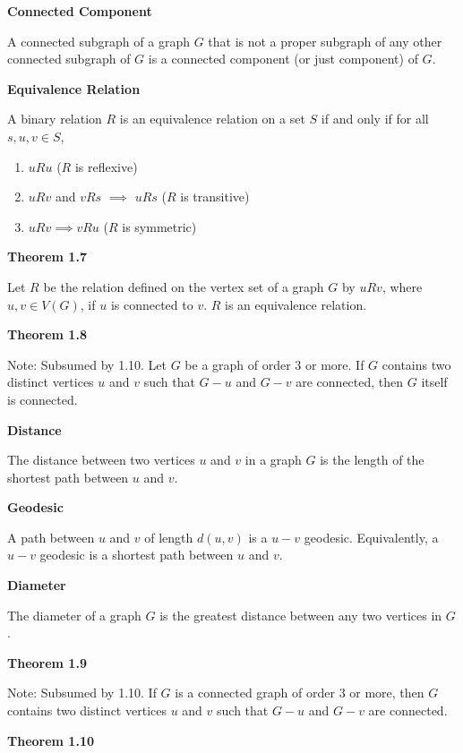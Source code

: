 \documentclass{article}
\begin{document}
\medskip\noindent\textbf{Connected Component}

    A connected subgraph of a graph $G$ that is not a proper subgraph of any other connected subgraph of $G$ is a connected component (or just component) of $G$.

\medskip\noindent\textbf{Equivalence Relation}

    A binary relation $R$ is an equivalence relation on a set $S$ if and only if for all $s,u,v \in S$,
    \begin{enumerate}
        \item $u R u$ ($R$ is reflexive)
        \item $u R v$ and $v R s$ $\implies$ $u R s$ ($R$ is transitive)
        \item $u R v \implies v R u$ ($R$ is symmetric)
    \end{enumerate}

\medskip\noindent\textbf{Theorem 1.7}

    Let $R$ be the relation defined on the vertex set of a graph $G$ by $u R v$, where $u,v \in V(G)$, if $u$ is connected to $v$. $R$ is an equivalence relation.

\medskip\noindent\textbf{Theorem 1.8}

    Note: Subsumed by 1.10.
    Let $G$ be a graph of order 3 or more. If $G$ contains two distinct vertices $u$ and $v$ such that $G - u$ and $G - v$ are connected, then $G$ itself is connected.

\medskip\noindent\textbf{Distance}

    The distance between two vertices $u$ and $v$ in a graph $G$ is the length of the shortest path between $u$ and $v$.

\medskip\noindent\textbf{Geodesic}

    A path between $u$ and $v$ of length $d(u,v)$ is a $u-v$ geodesic. Equivalently, a $u-v$ geodesic is a shortest path between $u$ and $v$.

\medskip\noindent\textbf{Diameter}

    The diameter of a graph $G$ is the greatest distance between any two vertices in $G$.

\medskip\noindent\textbf{Theorem 1.9}

    Note: Subsumed by 1.10.
    If $G$ is a connected graph of order 3 or more, then $G$ contains two distinct vertices $u$ and $v$ such that $G - u$ and $G - v$ are connected.

\medskip\noindent\textbf{Theorem 1.10}
\end{document}
